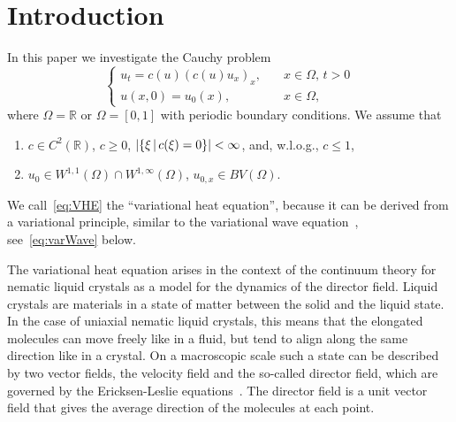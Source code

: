 \documentclass[11pt,leqno]{amsart}
\newcommand{\R}{\mathbb{R}}
\newcommand{\pt}[1]{#1_t}
\newcommand{\px}[1]{#1_x }
\newenvironment{Assumptions}%
{%
\renewcommand{\theenumi}{(\textbf{H}.\textbf{\arabic{enumi}})}
\renewcommand{\labelenumi}{\theenumi}
\begin{enumerate}}%
{\end{enumerate}}
\DeclarePairedDelimiter\abs{\lvert}{\rvert}
\begin{document}
\section{Introduction}
\label{sec:intro}
In this paper we investigate the Cauchy problem
\begin{equation}
\label{eq:VHE}
\begin{cases}
\pt u=c(u)\px{(c(u)\px u)},&\quad x\in\Omega,\,t>0\\
u(x,0)=u_0(x),&\quad x\in\Omega,
\end{cases}
\end{equation}
where $\Omega=\R$ or $\Omega=[0,1]$ with periodic boundary conditions. 
We assume that
\begin{Assumptions}
\item \label{ass:c} $c\in C^2(\R)$, $c\ge 0$, $\abs{\{\xi\,|\,c(\xi)=0\}}<\infty$, and, w.l.o.g., $c\le 1$,
\item \label{ass:init} $u_0\in W^{1,1}(\Omega)\cap W^{1,\infty}(\Omega)$, $u_{0,x}\in BV(\Omega)$.
\end{Assumptions}
We call~\eqref{eq:VHE} the ``variational heat equation'', because it can be derived from a variational principle, similar to the variational wave equation~\cite{HunterSaxton1991,Saxton1989,GlasseyHunterZheng1996,BressanZheng2006,ChenZheng2013}, see~\eqref{eq:varWave} below.

The variational heat equation arises in the context of the continuum theory for nematic liquid crystals as a model for the dynamics of the director field. Liquid crystals are materials in a state of matter between the solid and the liquid state. In the case of uniaxial nematic liquid crystals, this means that the elongated molecules can move freely like in a fluid, but tend to align along the same direction like in a crystal. On a macroscopic scale such a state can be described by two vector fields, the velocity field and the so-called director field, which are governed by the Ericksen-Leslie equations~\cite{Stewart2004-Book, Virga1994-Book, DeGennes1993-Book, Leslie1968, Leslie1979,Leslie1992,Ericksen1961}. The director field is a unit vector field that gives the average direction of the molecules at each point.
\end{document}
